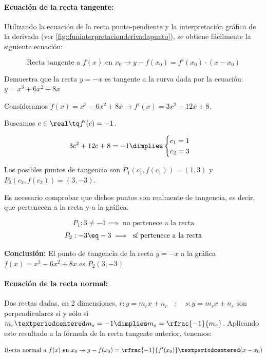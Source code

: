 \paragraph{Ecuación de la recta tangente:} Utilizando la ecuación de la recta punto-pendiente y la interpretación gráfica de la derivada (ver \ref{fig::funinterpretacionderivadapunto}), se obtiene fácilmente la siguiente ecuación:

\begin{mdframed}
	\begin{equation}
		\label{eq::rectatangente}
		\text{Recta tangente a }f(x)\text{ en }x_0 \to y-f(x_0) = f'(x_0)·(x-x_0)
	\end{equation}
\end{mdframed}

\begin{problem}
Demuestra que la recta $y=-x$ es tangente a la curva dada por la ecuación: $y=x^3+6x^2+8x$
\solution

Consideramos $f(x) = x^3-6x^2+8x \to f'(x) = 3x^2-12x+8$.

Buscamos $c\in\real\tq f'(c) = -1$.

\[
	3c^2+12c+8=-1 \dimplies \begin{cases}c_1 = 1\\c_2=3\end{cases}
\]

Los posibles puntos de tangencia son $P_1(c_1,f(c_1)) = (1,3)$ y $P_2(c_2,f(c_2)) = (3,-3)$.

Es necesario comprobar que dichos puntos son realmente de tangencia, es decir, que pertenecen a la recta y a la gráfica.

\[P_1: 3\neq -1 \implies \text{ no pertenece a la recta}\]
\[P_2: -3\eq -3 \implies \text{ sí pertenece a la recta}\]

\textbf{Conclusión: } El punto de tangencia de la recta $y=-x$ a la gráfica $f(x) = x^3-6x^2+8x$ es $P_2(3,-3)$
\end{problem}

\paragraph{Ecuación de la recta normal:} Dos rectas dadas, en 2 dimensiones, $r: y=m_rx+n_r\quad;\quad s:y=m_sx+n_s$ son perpendiculares si y sólo si $m_r·m_s = -1 \dimplies m_s = \rfrac{-1}{m_r}$.
%
Aplicando este resultado a la fórmula de la recta tangente anterior, tenemos:


\begin{mdframed}
	\begin{equation}
		\label{eq::rectatangente}
		\text{Recta normal a }f(x)\text{ en }x_0 \to y-f(x_0) = \rfrac{-1}{f'(x_0)}·(x-x_0)
	\end{equation}
\end{mdframed}


